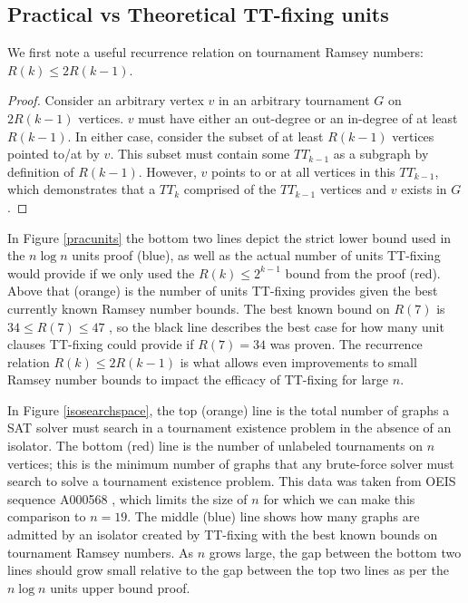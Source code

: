 \documentclass[conference]{IEEEtran}
\begin{document}
\subsection{Practical vs Theoretical TT-fixing units}
We first note a useful recurrence relation on tournament Ramsey numbers: $R(k) \leq 2R(k-1)$. 
\begin{proof}
Consider an arbitrary vertex $v$ in an arbitrary tournament $G$ on $2R(k-1)$ vertices. $v$ must have either an out-degree or an in-degree of at least $R(k-1)$. In either case, consider the subset of at least $R(k-1)$ vertices pointed to/at by $v$. This subset must contain some $TT_{k-1}$ as a subgraph by definition of $R(k-1)$. However, $v$ points to or at all vertices in this $TT_{k-1}$, which demonstrates that a $TT_k$ comprised of the $TT_{k-1}$ vertices and $v$ exists in $G$. 
\end{proof}

In Figure \ref{pracunits} the bottom two lines depict the strict lower bound used in the $n\log n$ units proof (blue), as well as the actual number of units TT-fixing would provide if we only used the $R(k) \leq 2^{k-1}$ bound from the proof (red). Above that (orange) is the number of units TT-fixing provides given the best currently known Ramsey number bounds.  The best known bound on $R(7)$ is $34 \leq R(7) \leq 47$ \cite{directedramsey}, so the black line describes the best case for how many unit clauses TT-fixing could provide if $R(7) = 34$ was proven. The recurrence relation $R(k) \le 2R(k-1)$ is what allows even improvements to small Ramsey number bounds to impact the efficacy of TT-fixing for large $n$. %

In Figure \ref{isosearchspace}, the top (orange) line is the total number of graphs a SAT solver must search in a tournament existence problem in the absence of an isolator.  The bottom (red) line is the number of unlabeled tournaments on $n$ vertices; this is the minimum number of graphs that any brute-force solver must search to solve a tournament existence problem. This data was taken from OEIS sequence A000568 \cite{ref_oeis}, which  limits the size of $n$ for which we can make this comparison to $n=19$. The middle (blue) line shows how many graphs are admitted by an isolator created by TT-fixing with the best known bounds on tournament Ramsey numbers. As $n$ grows large, the gap between the bottom two lines should grow small relative to the gap between the top two lines as per the $n \log n$ units upper bound proof.
\end{document}
